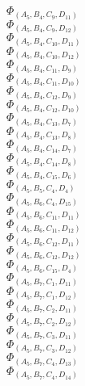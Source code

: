 \documentclass[14pt]{article}
\begin{document}
    $\Phi_{({A}_{5}, {B}_{4}, {C}_{9}, {D}_{11})}$ \\ 
    $\Phi_{({A}_{5}, {B}_{4}, {C}_{9}, {D}_{12})}$ \\ 
    $\Phi_{({A}_{5}, {B}_{4}, {C}_{10}, {D}_{11})}$ \\ 
    $\Phi_{({A}_{5}, {B}_{4}, {C}_{10}, {D}_{12})}$ \\ 
    $\Phi_{({A}_{5}, {B}_{4}, {C}_{11}, {D}_{9})}$ \\ 
    $\Phi_{({A}_{5}, {B}_{4}, {C}_{11}, {D}_{10})}$ \\ 
    $\Phi_{({A}_{5}, {B}_{4}, {C}_{12}, {D}_{9})}$ \\ 
    $\Phi_{({A}_{5}, {B}_{4}, {C}_{12}, {D}_{10})}$ \\ 
    $\Phi_{({A}_{5}, {B}_{4}, {C}_{13}, {D}_{7})}$ \\ 
    $\Phi_{({A}_{5}, {B}_{4}, {C}_{13}, {D}_{8})}$ \\ 
    $\Phi_{({A}_{5}, {B}_{4}, {C}_{14}, {D}_{7})}$ \\ 
    $\Phi_{({A}_{5}, {B}_{4}, {C}_{14}, {D}_{8})}$ \\ 
    $\Phi_{({A}_{5}, {B}_{4}, {C}_{15}, {D}_{6})}$ \\ 
    $\Phi_{({A}_{5}, {B}_{5}, {C}_{4}, {D}_{4})}$ \\ 
    $\Phi_{({A}_{5}, {B}_{6}, {C}_{4}, {D}_{15})}$ \\ 
    $\Phi_{({A}_{5}, {B}_{6}, {C}_{11}, {D}_{11})}$ \\ 
    $\Phi_{({A}_{5}, {B}_{6}, {C}_{11}, {D}_{12})}$ \\ 
    $\Phi_{({A}_{5}, {B}_{6}, {C}_{12}, {D}_{11})}$ \\ 
    $\Phi_{({A}_{5}, {B}_{6}, {C}_{12}, {D}_{12})}$ \\ 
    $\Phi_{({A}_{5}, {B}_{6}, {C}_{15}, {D}_{4})}$ \\ 
    $\Phi_{({A}_{5}, {B}_{7}, {C}_{1}, {D}_{11})}$ \\ 
    $\Phi_{({A}_{5}, {B}_{7}, {C}_{1}, {D}_{12})}$ \\ 
    $\Phi_{({A}_{5}, {B}_{7}, {C}_{2}, {D}_{11})}$ \\ 
    $\Phi_{({A}_{5}, {B}_{7}, {C}_{2}, {D}_{12})}$ \\ 
    $\Phi_{({A}_{5}, {B}_{7}, {C}_{3}, {D}_{11})}$ \\ 
    $\Phi_{({A}_{5}, {B}_{7}, {C}_{3}, {D}_{12})}$ \\ 
    $\Phi_{({A}_{5}, {B}_{7}, {C}_{4}, {D}_{13})}$ \\ 
    $\Phi_{({A}_{5}, {B}_{7}, {C}_{4}, {D}_{14})}$ \\ 
\end{document}
